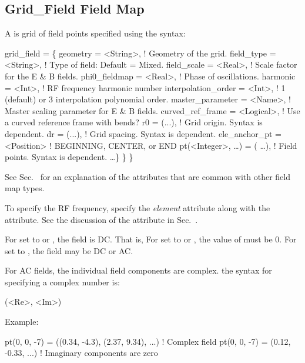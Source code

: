 \subsection{Grid_Field Field Map}
\label{s:grid.field}

A  is grid of field points specified using the syntax:
\begin{example}
  grid_field = \{ 
    geometry         = <String>,    ! Geometry of the grid.
    field_type       = <String>,    ! Type of field: Default = Mixed.
    field_scale      = <Real>,      ! Scale factor for the E & B fields.
    phi0_fieldmap    = <Real>,      ! Phase of oscillations.
    harmonic         = <Int>,       ! RF frequency harmonic number 
    interpolation_order = <Int>,    ! 1 (default) or 3 interpolation polynomial order.
    master_parameter = <Name>,      ! Master scaling parameter for E & B fields.
    curved_ref_frame = <Logical>,   ! Use a curved reference frame with bends?
    r0   = (...),                   ! Grid origin. Syntax is  dependent.
    dr   = (...),                   ! Grid spacing. Syntax is  dependent.
    ele_anchor_pt = <Position>      ! BEGINNING, CENTER, or END
    pt(<Integer>, \dots) = ( \ldots ), ! Field points. Syntax is  dependent.
    \ldots \} \} \}
\end{example}
See Sec.~ for an explanation of the attributes that are common with
other field map types.

To specify the RF frequency, specify the  {\em element} attribute along with
the  attribute. See the discussion of the  attribute in 
Sec.~.

For  set to  or , the field is DC. That is, For
 set to  or , the value of  must be
0. For  set to , the field may be DC or AC. 

For AC fields, the individual field components are complex.  the syntax for specifying a complex
number is:
\begin{example}
  (<Re>, <Im>)
\end{example}
Example:
\begin{example}
  pt(0, 0, -7) = ((0.34, -4.3), (2.37, 9.34), ...)  ! Complex field
  pt(0, 0, -7) = (0.12, -0.33, ...)                 ! Imaginary components are zero
\end{example}

